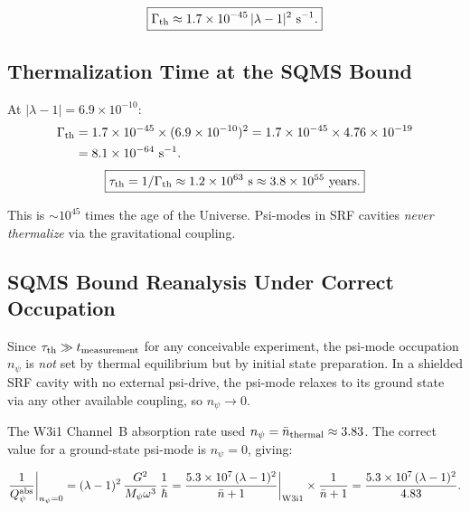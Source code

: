 \documentclass[11pt,twocolumn]{article}
\newcommand{\lam}{\lambda}
\newcommand{\Mpsi}{M_\psi}
\newcommand{\tauth}{\tau_{\rm th}}
\newcommand{\Gammath}{\Gamma_{\rm th}}
\newcommand{\nbar}{\bar{n}}
\begin{document}
\begin{equation}
\boxed{
\Gammath \approx 1.7\times10^{-45}\,|\lam-1|^2~\text{s}^{-1}.
}
\end{equation}

\subsection{Thermalization Time at the SQMS Bound}

At $|\lam-1| = 6.9\times10^{-10}$:
\begin{align}
\Gammath &= 1.7\times10^{-45}\times(6.9\times10^{-10})^2
= 1.7\times10^{-45}\times4.76\times10^{-19}
\nonumber\\
&= 8.1\times10^{-64}~\text{s}^{-1}.
\end{align}
\begin{equation}
\boxed{
\tauth = 1/\Gammath \approx 1.2\times10^{63}~\text{s}
\approx 3.8\times10^{55}~\text{years}.
}
\label{eq:tau_th_sqms}
\end{equation}

This is $\sim 10^{45}$ times the age of the Universe. Psi-modes in SRF
cavities \emph{never thermalize} via the gravitational coupling.

\subsection{SQMS Bound Reanalysis Under Correct Occupation}

Since $\tauth \gg t_{\rm measurement}$ for any conceivable experiment, the
psi-mode occupation $n_\psi$ is \emph{not} set by thermal equilibrium but by
initial state preparation. In a shielded SRF cavity with no external psi-drive,
the psi-mode relaxes to its ground state via any other available coupling, so
$n_\psi \to 0$.

The W3i1 Channel~B absorption rate used $n_\psi = \nbar_{\rm thermal} \approx 3.83$.
The correct value for a ground-state psi-mode is $n_\psi = 0$, giving:

\begin{equation}
\frac{1}{Q_\psi^{\rm abs}}\bigg|_{n_\psi=0}
= (\lam-1)^2\,\frac{G^2}{\Mpsi\omega^3}\,\frac{1}{\hbar}
= \frac{5.3\times10^7\,(\lam-1)^2}{\nbar+1}\bigg|_{\rm W3i1}\times\frac{1}{\nbar+1}
= \frac{5.3\times10^7\,(\lam-1)^2}{4.83}.
\end{equation}
\end{document}
